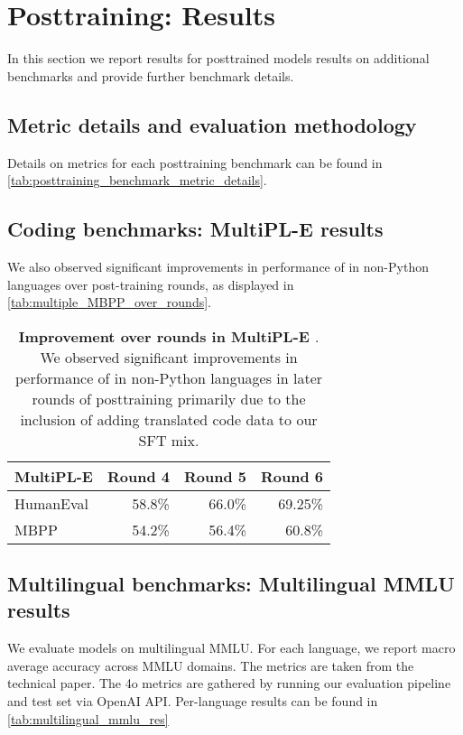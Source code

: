 \section{Posttraining: Results}
\label{appendix:posttraining_results}

In this section we report results for \llamathree posttrained models results on additional benchmarks and provide further benchmark details.


\subsection{Metric details and evaluation methodology}\label{appendix:posttraining_eval:methodology}

Details on metrics for each posttraining benchmark can be found in \autoref{tab:posttraining_benchmark_metric_details}.







\subsection{Coding benchmarks: MultiPL-E results}\label{appendix:posttraining_results:coding}

We also observed significant improvements in performance of \llamathree in non-Python languages over post-training rounds, as displayed in \autoref{tab:multiple_MBPP_over_rounds}.




\begin{table}[t!]
\center
\setlength{\tabcolsep}{3pt}
\begin{tabular}{lrrr} %
\toprule
MultiPL-E & Round 4 & Round 5 & Round 6 \\
\midrule
HumanEval & 58.8\%  & 66.0\% & 69.25\% \\
MBPP  &  54.2\%  & 56.4\% & 60.8\% \\
\bottomrule
\end{tabular}%
\caption{\textbf{Improvement over rounds in MultiPL-E \citep{cassano2022multiple}}. We observed significant improvements in performance of \llamathree in non-Python languages in later rounds of posttraining primarily due to the inclusion of adding translated code data to our SFT mix.} \label{tab:multiple_MBPP_over_rounds}
\end{table}


\subsection{Multilingual benchmarks: Multilingual MMLU results}\label{appendix:mmlu_detailed_results}
We evaluate  models on multilingual MMLU. For each language, we report macro average accuracy across MMLU domains.
The \gpt metrics are taken from the technical paper. The \gpt4o metrics are gathered by running our evaluation pipeline and test set via OpenAI API.
Per-language results can be found in \autoref{tab:multilingual_mmlu_res}


